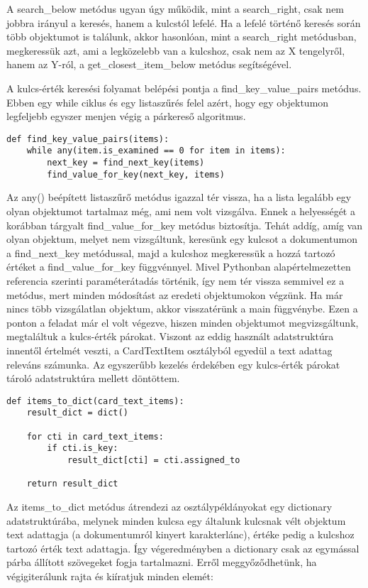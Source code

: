 \documentclass[12pt]{report}
\begin{document}
A search\_below metódus ugyan úgy működik, mint a search\_right, csak nem jobbra irányul a keresés, hanem a kulcstól lefelé. Ha a lefelé történő keresés során több objektumot is találunk, akkor hasonlóan, mint a search\_right metódusban, megkeressük azt, ami a legközelebb van a kulcshoz, csak nem az X tengelyről, hanem az Y-ról, a get\_closest\_item\_below metódus segítségével.

A kulcs-érték keresési folyamat belépési pontja a find\_key\_value\_pairs metódus. Ebben egy while ciklus és egy listaszűrés felel azért, hogy egy objektumon legfeljebb egyszer menjen végig a párkereső algoritmus.

\begin{verbatim}
def find_key_value_pairs(items):
    while any(item.is_examined == 0 for item in items):
        next_key = find_next_key(items)
        find_value_for_key(next_key, items)
\end{verbatim}

Az any() beépített listaszűrő metódus igazzal tér vissza, ha a lista legalább egy olyan objektumot tartalmaz még, ami nem volt vizsgálva. Ennek a helyességét a korábban tárgyalt find\_value\_for\_key metódus biztosítja. Tehát addíg, amíg van olyan objektum, melyet nem vizsgáltunk, keresünk egy kulcsot a dokumentumon a  find\_next\_key metódussal, majd a kulcshoz megkeressük a hozzá tartozó értéket a find\_value\_for\_key függvénnyel. Mivel Pythonban alapértelmezetten referencia szerinti paraméterátadás történik, így nem tér vissza semmivel ez a metódus, mert minden módosítást az eredeti objektumokon végzünk.
Ha már nincs több vizsgálatlan objektum, akkor visszatérünk a main függvénybe. Ezen a ponton a feladat már el volt végezve, hiszen minden objektumot megvizsgáltunk, megtaláltuk a kulcs-érték párokat. Viszont az eddig használt adatstruktúra innentől értelmét veszti, a CardTextItem osztályból egyedül a text adattag releváns számunka. Az egyszerűbb kezelés érdekében egy kulcs-érték párokat tároló adatstruktúra mellett döntöttem.

\newpage

\begin{verbatim}
def items_to_dict(card_text_items):
    result_dict = dict()

    for cti in card_text_items:
        if cti.is_key:
            result_dict[cti] = cti.assigned_to

    return result_dict
\end{verbatim}

Az items\_to\_dict metódus átrendezi az osztálypéldányokat egy dictionary adatstruktúrába, melynek minden kulcsa egy általunk kulcsnak vélt objektum text adattagja (a dokumentumról kinyert karakterlánc), értéke pedig a kulcshoz tartozó érték text adattagja. Így végeredményben a dictionary csak az egymással párba állított szövegeket fogja tartalmazni.
Erről meggyőződhetünk, ha végigiterálunk rajta és kiíratjuk minden elemét:
\end{document}
